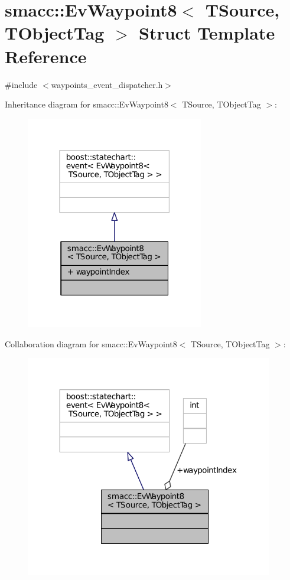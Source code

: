 \hypertarget{structsmacc_1_1EvWaypoint8}{}\section{smacc\+:\+:Ev\+Waypoint8$<$ T\+Source, T\+Object\+Tag $>$ Struct Template Reference}
\label{structsmacc_1_1EvWaypoint8}


{\ttfamily \#include $<$waypoints\+\_\+event\+\_\+dispatcher.\+h$>$}



Inheritance diagram for smacc\+:\+:Ev\+Waypoint8$<$ T\+Source, T\+Object\+Tag $>$\+:
\nopagebreak
\begin{figure}[H]
\begin{center}
\leavevmode
\includegraphics[width=219pt]{structsmacc_1_1EvWaypoint8__inherit__graph}
\end{center}
\end{figure}


Collaboration diagram for smacc\+:\+:Ev\+Waypoint8$<$ T\+Source, T\+Object\+Tag $>$\+:
\nopagebreak
\begin{figure}[H]
\begin{center}
\leavevmode
\includegraphics[width=305pt]{structsmacc_1_1EvWaypoint8__coll__graph}
\end{center}
\end{figure}
